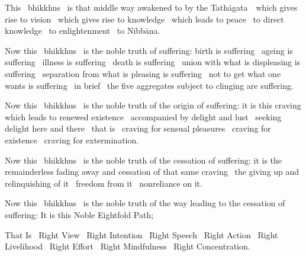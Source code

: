 \begin{english-hang}
  This \breathmark\ bhikkhus \breathmark\ is that middle way awakened to by the \mbox{Tathāgata}~\breathmark\ which gives rise to vision \breathmark\ which gives rise to knowledge \breathmark\ which leads to peace \breathmark\ to direct knowledge \breathmark\ to enlightenment \breathmark\ to Nibbāna.
\end{english-hang}

\begin{english-hang}
  Now this \breathmark\ bhikkhus \breathmark\ is the noble truth of suffering: birth is suffering \breathmark\ ageing is suffering \breathmark\ illness is suffering \breathmark\ death is suffering \breathmark\ union with what is displeasing is suffering \breathmark\ separation from what is pleasing is suffering \breathmark\ not to get what one wants is suffering \breathmark\ in brief \breathmark\ the five aggregates subject to clinging are suffering.
\end{english-hang}

\begin{english-hang}
  Now this \breathmark\ bhikkhus \breathmark\ is the noble truth of the origin of suffering: it is this craving which leads to renewed existence \breathmark\ accompanied by delight and lust \breathmark\ seeking delight here and there \breathmark\ that is \breathmark\ craving for sensual pleasures \breathmark\ craving for existence \breathmark\ craving for extermination.
\end{english-hang}

\begin{english-hang}
  Now this \breathmark\ bhikkhus \breathmark\ is the noble truth of the cessation of suffering: it is the remainderless fading away and cessation of that same craving \breathmark\ the giving up and relinquishing of it \breathmark\ freedom from it \breathmark\ nonreliance on it.
\end{english-hang}

\begin{english-hang}
  Now this \breathmark\ bhikkhus \breathmark\ is the noble truth of the way leading to the cessation of suffering: It is this Noble Eightfold Path;
\end{english-hang}

\begin{english-hang}
  That Is \breathmark\ Right View \breathmark\ Right Intention \breathmark\ Right Speech \breathmark\ Right Action \breathmark\ Right Livelihood \breathmark\ Right Effort \breathmark\ Right Mindfulness \breathmark\ Right Concentration.
\end{english-hang}

